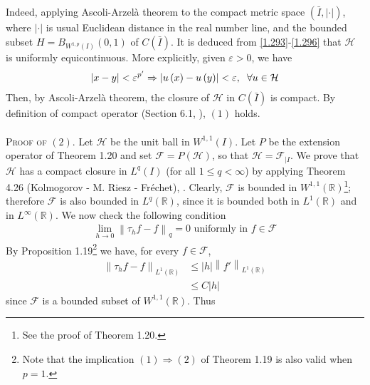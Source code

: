 \documentclass[a4paper,oneside]{book}
\numberwithin{equation}{chapter}
\begin{document}
Indeed, applying Ascoli-Arzel\`{a} theorem to the compact metric space $\left( {\bar I,\left|  \cdot  \right|} \right)$, where ${\left|  \cdot  \right|}$ is usual Euclidean distance in the real number line, and the bounded subset $H = {B_{{W^{1,p}}\left( I \right)}}\left( {0,1} \right)$ of $C\left( {\bar I} \right)$. It is deduced from \eqref{1.293}-\eqref{1.296} that $\mathcal{H}$ is uniformly equicontinuous. More explicitly, given $\varepsilon >0$, we have
\begin{align}
\left| {x - y} \right| < {\varepsilon ^{p'}} \Rightarrow \left| {u\left( x \right) - u\left( y \right)} \right| < \varepsilon ,\hspace{0.2cm}\forall u \in \mathcal{H}
\end{align}
Then, by Ascoli-Arzel\`{a} theorem, the closure of $\mathcal{H}$ in $C\left(\bar{I}\right)$ is compact. By definition of compact operator (Section 6.1, \cite{1}), $\left(1\right)$ holds.\\
\\
\textsc{Proof of $\left(2\right)$.} Let $\mathcal{H}$ be the unit ball in $W^{1,1}\left(I\right)$. Let $P$ be the extension operator of Theorem 1.20 and set $\mathcal{F}=P\left(\mathcal{H}\right)$, so that $\mathcal{H} = {\mathcal{F}_{\left| I \right.}}$. We prove that $\mathcal{H}$ has a compact closure in $L^q\left(I\right)$ (for all $1 \le q<\infty$) by applying Theorem 4.26 (Kolmogorov - M. Riesz - Fr\'{e}chet), \cite{1}. Clearly, $\mathcal{F}$ is bounded in $W^{1,1}\left(\mathbb{R}\right)$\footnote{See the proof of Theorem 1.20.}; therefore $\mathcal{F}$ is also bounded in $L^q\left(\mathbb{R}\right)$, since it is bounded both in $L^1\left(\mathbb{R}\right)$ and in $L^{\infty}\left(\mathbb{R}\right)$. We now check the following condition
\begin{align}
\mathop {\lim }\limits_{h \to 0} {\left\| {{\tau _h}f - f} \right\|_q} = 0\mbox{ uniformly in } f  \in \mathcal{F}
\end{align}
By Proposition 1.19\footnote{Note that the implication $\left(1\right) \Rightarrow \left(2\right)$ of Theorem 1.19 is also valid when $p=1$.} we have, for every $f\in \mathcal{F}$,
\begin{align}
{\left\| {{\tau _h}f - f} \right\|_{{L^1}\left( \mathbb{R} \right)}} &\le \left| h \right|{\left\| {f'} \right\|_{{L^1}\left(\mathbb{R} \right)}}\\
 &\le C\left| h \right|
\end{align}
since $\mathcal{F}$ is a bounded subset of $W^{1,1}\left(\mathbb{R}\right)$. Thus
\end{document}

